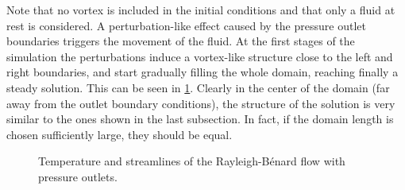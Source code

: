 Note that no vortex is included in the initial conditions and that only a fluid at rest is considered. A perturbation-like effect caused by the pressure outlet boundaries triggers the movement of the fluid. At the first stages of the simulation the perturbations induce a vortex-like structure close to the left and right boundaries, and start gradually filling the whole domain, reaching finally a steady solution. This can be seen in \cref{fig:RayBerUnsteadySol}. Clearly in the center of the domain (far away from the outlet boundary conditions), the structure of the solution is very similar to the ones shown in the last subsection. In fact, if the domain length is chosen sufficiently large, they should be equal. 
\begin{figure}[t]
	\centering
	\pgfplotsset{width=0.96\textwidth, compat=1.3}
	\par\bigskip%
	\par\bigskip%
	\par\bigskip%
	\par\bigskip%
	\par\bigskip%
	\par\bigskip%
	\par\bigskip%
	\par\bigskip%
	\caption{Temperature and streamlines of the Rayleigh-Bénard flow with pressure outlets.}\label{fig:RayBerUnsteadySol}
\end{figure}
\FloatBarrier